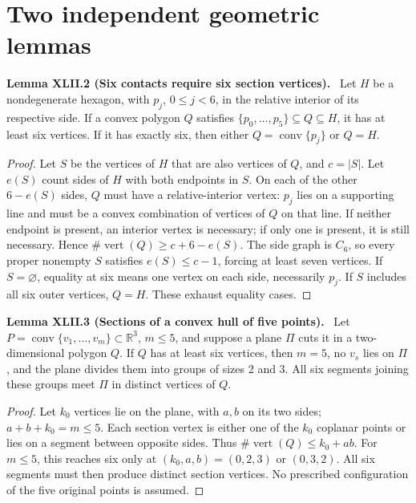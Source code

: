 \documentclass[11pt,a4paper,oneside]{book}
\newcommand{\R}{\mathbb R}\newcommand{\C}{\mathbb C}\newcommand{\Z}{\mathbb Z}\newcommand{\N}{\mathbb N}\newcommand{\Q}{\mathbb Q}
\newcommand{\statement}[3]{\par\medskip\noindent\textbf{#1 #2 (#3).}\ }
\begin{document}
\section{Two independent geometric lemmas}
\statement{Lemma}{XLII.2}{Six contacts require six section vertices}
Let $H$ be a nondegenerate hexagon, with $p_j$, $0\le j<6$, in the relative interior of its respective side. If a convex polygon $Q$ satisfies $\{p_0,\ldots,p_5\}\subseteq Q\subseteq H$, it has at least six vertices. If it has exactly six, then either $Q=\operatorname{conv}\{p_j\}$ or $Q=H$.
\begin{proof}
Let $S$ be the vertices of $H$ that are also vertices of $Q$, and $c=|S|$. Let $e(S)$ count sides of $H$ with both endpoints in $S$. On each of the other $6-e(S)$ sides, $Q$ must have a relative-interior vertex: $p_j$ lies on a supporting line and must be a convex combination of vertices of $Q$ on that line. If neither endpoint is present, an interior vertex is necessary; if only one is present, it is still necessary. Hence $\#\operatorname{vert}(Q)\ge c+6-e(S)$. The side graph is $C_6$, so every proper nonempty $S$ satisfies $e(S)\le c-1$, forcing at least seven vertices. If $S=\varnothing$, equality at six means one vertex on each side, necessarily $p_j$. If $S$ includes all six outer vertices, $Q=H$. These exhaust equality cases.
\end{proof}
\statement{Lemma}{XLII.3}{Sections of a convex hull of five points}
Let $P=\operatorname{conv}\{v_1,\ldots,v_m\}\subset\R^3$, $m\le5$, and suppose a plane $\Pi$ cuts it in a two-dimensional polygon $Q$. If $Q$ has at least six vertices, then $m=5$, no $v_s$ lies on $\Pi$, and the plane divides them into groups of sizes 2 and 3. All six segments joining these groups meet $\Pi$ in distinct vertices of $Q$.
\begin{proof}
Let $k_0$ vertices lie on the plane, with $a,b$ on its two sides; $a+b+k_0=m\le5$. Each section vertex is either one of the $k_0$ coplanar points or lies on a segment between opposite sides. Thus $\#\operatorname{vert}(Q)\le k_0+ab$. For $m\le5$, this reaches six only at $(k_0,a,b)=(0,2,3)$ or $(0,3,2)$. All six segments must then produce distinct section vertices. No prescribed configuration of the five original points is assumed.
\end{proof}
\end{document}
